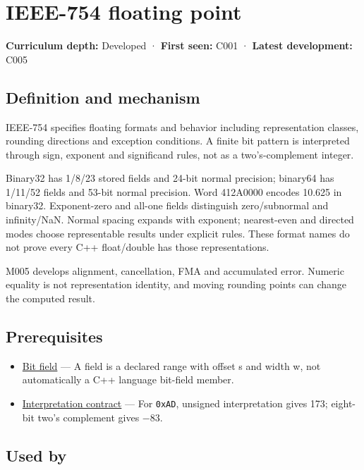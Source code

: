 \hypertarget{appendix-343615f49ddf}{}
\section{IEEE-754 floating point}\label{appendix-343615f49ddf-ieee-754-floating-point}

\textbf{Curriculum depth:} Developed · \textbf{First seen:} C001 · \textbf{Latest development:} C005

\subsection{Definition and mechanism}\label{appendix-343615f49ddf-definition-and-mechanism}

IEEE-754 specifies floating formats and behavior including representation classes, rounding directions and exception conditions. A finite bit pattern is interpreted through sign, exponent and significand rules, not as a two's-complement integer.

Binary32 has 1/8/23 stored fields and 24-bit normal precision; binary64 has 1/11/52 fields and 53-bit normal precision. Word 412A0000 encodes 10.625 in binary32. Exponent-zero and all-one fields distinguish zero/subnormal and infinity/NaN. Normal spacing expands with exponent; nearest-even and directed modes choose representable results under explicit rules. These format names do not prove every C++ float/double has those representations.

M005 develops alignment, cancellation, FMA and accumulated error. Numeric equality is not representation identity, and moving rounding points can change the computed result.

\subsection{Prerequisites}\label{appendix-343615f49ddf-prerequisites}

\begin{itemize}
\tightlist
\item
  \hyperref[appendix-ac697f5c66e8]{Bit field} --- A field is a declared range with offset s and width w, not automatically a C++ language bit-field member.
\item
  \hyperref[appendix-f414bd4ed05c]{Interpretation contract} --- For \texttt{0xAD}, unsigned interpretation gives 173; eight-bit two's complement gives −83.
\end{itemize}

\subsection{Used by}\label{appendix-343615f49ddf-used-by}

